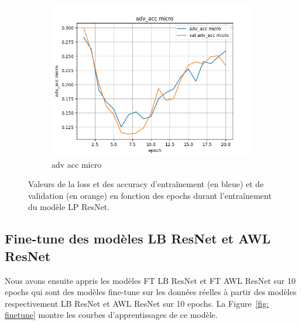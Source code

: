 \documentclass[a4paper]{article}
\begin{document}
\begin{figure}[ht]
\begin{subfigure}{0.32\textwidth}
        \includegraphics[width=\linewidth]{../logs/adv_img256_1/adv_acc micro.png}
        \caption{adv acc micro}
    \end{subfigure}
    \caption{Valeurs de la loss et des accuracy d'entraînement (en bleue) et de validation (en orange) en fonction des epochs durant l'entraînement du modèle LP ResNet.}
    \label{fig: train LP ResNet}
\end{figure}

\subsection{Fine-tune des modèles LB ResNet et AWL ResNet}
Nous avons ensuite appris les modèles FT LB ResNet et FT AWL ResNet sur 10 epochs qui sont des modèles fine-tune sur les données réelles à partir des modèles respectivement LB ResNet et AWL ResNet sur 10 epochs. La Figure~\ref{fig: finetune} montre les courbes d'apprentissages de ce modèle.
\end{document}
